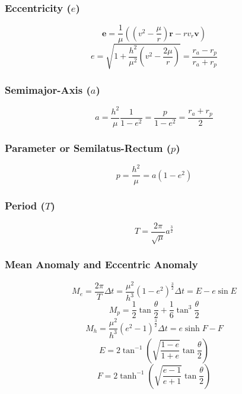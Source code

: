 \subsubsection{Eccentricity ($e$)}
\begin{equation}
    \mathbf{e} = \frac{1}{\mu}\left(\left(v^2-\frac{\mu}{r}\right)\mathbf{r}-rv_{r}\mathbf{v}\right)
\end{equation}
\begin{equation}
    e = \sqrt{1+\frac{h^2}{\mu^2}\left(v^2-\frac{2\mu}{r}\right)} = \frac{r_{a}-r_{p}}{r_{a}+r_{p}}
\end{equation}


\subsubsection{Semimajor-Axis ($a$)}
\begin{equation}
    a = \frac{h^2}{\mu}\frac{1}{1-e^2} = \frac{p}{1-e^2} = \frac{r_a + r_p}{2}
\end{equation}

\subsubsection{Parameter or Semilatus-Rectum ($p$)}
\begin{equation}
    p = \frac{h^2}{\mu} = a\left(1-e^{2}\right)
\end{equation}


\subsubsection{Period ($T$)}
\begin{equation}
    T = \frac{2\pi}{\sqrt{\mu}}a^{\frac{3}{2}}
\end{equation}


\subsubsection{Mean Anomaly and Eccentric Anomaly}
\begin{equation}
    M_e = \frac{2\pi}{T}\Delta{}t = \frac{\mu^2}{h^3}\left(1-e^2\right)^\frac{3}{2}\Delta{}t = E - e\sin{E}
\end{equation}
\begin{equation}
    M_p = \frac{1}{2}\tan{\frac{\theta}{2}} + \frac{1}{6}\tan^{3}{\frac{\theta}{2}}
\end{equation}
\begin{equation}
    M_h = \frac{\mu^2}{h^3}\left(e^2-1\right)^\frac{3}{2}\Delta{}t = e\sinh{F}-F
\end{equation}
\begin{equation}
    E = 2\tan^{-1}{\left(\sqrt{\frac{1-e}{1+e}}\tan{\frac{\theta}{2}}\right)}
\end{equation}
\begin{equation}
    F = 2\tanh^{-1}{\left(\sqrt{\frac{e-1}{e+1}}\tan{\frac{\theta}{2}}\right)}
\end{equation}


